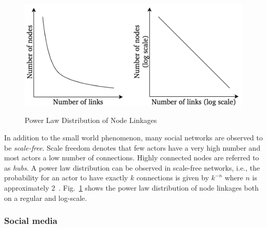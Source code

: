 \begin{figure}[h]
  \centering
  \includegraphics[height=6cm]{img/power_law_linkages}
  \caption[Power Law Distribution of Node Linkages]{Power Law Distribution of Node Linkages~\cite{Barabasi2003}}
\label{fig:power_law}
\end{figure}

In addition to the small world phenomenon, many social networks are observed to
be \textit{scale-free}.
Scale freedom denotes that few actors have a very high number and most actors 
a low number of connections.
Highly connected nodes are referred to as \textit{hubs}.
A power law distribution can be observed in scale-free networks, i.e., the
probability for an actor to have exactly $k$ connections is given by $k^{-n}$
where $n$ is approximately 2~\cite{Barabasi2003}.
Fig.~\ref{fig:power_law} shows the power law distribution of node linkages both
on a regular and log-scale.

\subsubsection{Social media}
\label{sub:sn_social_media}

